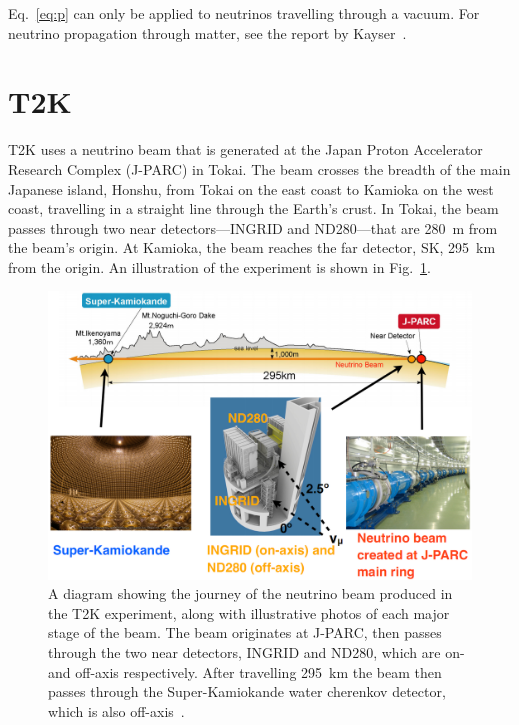 \documentclass[aps,pra,12pt,notitlepage,tightenlines]{revtex4-1}
\begin{document}
Eq.~\ref{eq:p} can only be applied to neutrinos travelling through a vacuum. For neutrino propagation through matter, see the report by Kayser~\cite{Kayser:2005cd}.

\section{T2K}
T2K uses a neutrino beam that is generated at the Japan Proton Accelerator Research Complex (J-PARC) in Tokai. The beam crosses the breadth of the main Japanese island, Honshu, from Tokai on the east coast to Kamioka on the west coast, travelling in a straight line through the Earth's crust. In Tokai, the beam passes through two near detectors---INGRID and ND280---that are 280~m from the beam's origin. At Kamioka, the beam reaches the far detector, SK, 295~km from the origin. An illustration of the experiment is shown in Fig.\ \ref{fig:t2k}.
\begin{figure}
 \includegraphics[scale=0.33]{T2K_detail}
 \caption{A diagram showing the journey of the neutrino beam produced in the T2K experiment, along with illustrative photos of each major stage of the beam. The beam originates at J-PARC, then passes through the two near detectors, INGRID and ND280, which are on- and off-axis respectively. After travelling 295~km the beam then passes through the Super-Kamiokande water cherenkov detector, which is also off-axis~\cite{Jamieson:2015rza}.}
 \label{fig:t2k}
\end{figure}
\end{document}
